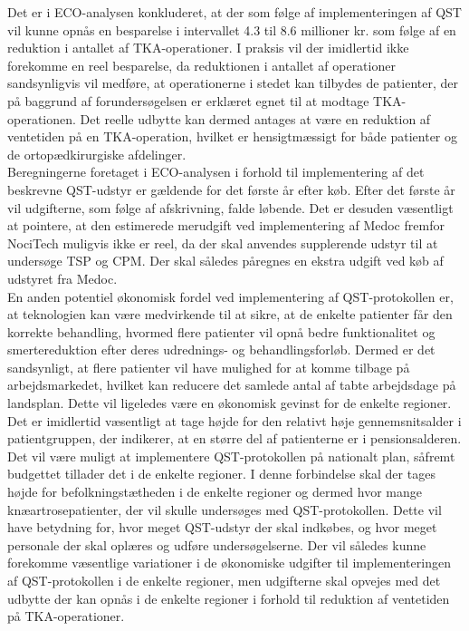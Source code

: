Det er i ECO-analysen konkluderet, at der som følge af implementeringen af QST vil kunne opnås en besparelse i intervallet 4.3 til 8.6 millioner kr. som følge af en reduktion i antallet af TKA-operationer. I praksis vil der imidlertid ikke forekomme en reel besparelse, da reduktionen i antallet af operationer sandsynligvis vil medføre, at operationerne i stedet kan tilbydes de patienter, der på baggrund af forundersøgelsen er erklæret egnet til at modtage TKA-operationen. Det reelle udbytte kan dermed antages at være en reduktion af ventetiden på en TKA-operation, hvilket er hensigtmæssigt for både patienter og de ortopædkirurgiske afdelinger.\\
Beregningerne foretaget i ECO-analysen i forhold til implementering af det beskrevne QST-udstyr er gældende for det første år efter køb. Efter det første år vil udgifterne, som følge af afskrivning, falde løbende. Det er desuden væsentligt at pointere, at den estimerede merudgift ved implementering af Medoc fremfor NociTech muligvis ikke er reel, da der skal anvendes supplerende udstyr til at undersøge TSP og CPM. Der skal således påregnes en ekstra udgift ved køb af udstyret fra Medoc. \\
En anden potentiel økonomisk fordel ved implementering af QST-protokollen er, at teknologien kan være medvirkende til at sikre, at de enkelte patienter får den korrekte behandling, hvormed flere patienter vil opnå bedre funktionalitet og smertereduktion efter deres udrednings- og behandlingsforløb. Dermed er det sandsynligt, at flere patienter vil have mulighed for at komme tilbage på arbejdsmarkedet, hvilket kan reducere det samlede antal af tabte arbejdsdage på landsplan. Dette vil ligeledes være en økonomisk gevinst for de enkelte regioner. Det er imidlertid væsentligt at tage højde for den relativt høje gennemsnitsalder i patientgruppen, der indikerer, at en større del af patienterne er i pensionsalderen. \\
Det vil være muligt at implementere QST-protokollen på nationalt plan, såfremt budgettet tillader det i de enkelte regioner. I denne forbindelse skal der tages højde for befolkningstætheden i de enkelte regioner og dermed hvor mange knæartrosepatienter, der vil skulle undersøges med QST-protokollen. Dette vil have betydning for, hvor meget QST-udstyr der skal indkøbes, og hvor meget personale der skal oplæres og udføre undersøgelserne. Der vil således kunne forekomme væsentlige variationer i de økonomiske udgifter til implementeringen af QST-protokollen i de enkelte regioner, men udgifterne skal opvejes med det udbytte der kan opnås i de enkelte regioner i forhold til reduktion af ventetiden på TKA-operationer.


